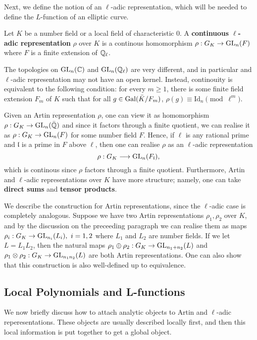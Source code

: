 Next, we define the notion of an $\ell$-adic representation, which will be needed to define the $L$-function of an elliptic curve.

\begin{defn}
    Let $K$ be a number field or a local field of characteristic $0$. A \textbf{continuous $\ell$-adic representation} $\rho$ over $K$ is a continous homomorphism $\rho:G_K\to\mathrm{GL}_n(F)$ where $F$ is a finite extension of $\mathbb{Q}_\ell$.
\end{defn}

\begin{rem} \label{rem_cont_ladic}
    The topologies on $\mathrm{GL}_n(\mathbb{C})$ and $\mathrm{GL}_n(\mathbb{Q}_\ell)$ are very different, and in particular and $\ell$-adic representation may not have an open kernel. Instead, continouity is equivalent to the following condition: for every $m\geq1$, there is some finite field extension $F_m$ of $K$ such that for all $g\in\mathrm{Gal}(\bar{K}/F_m)$, $\rho(g)\equiv \mathrm{Id}_n\pmod{\ell^m}$.
\end{rem}

Given an Artin representation $\rho$, one can view it as homomorphism $\rho:G_K\to\mathrm{GL}_n(\bar{\mathbb{Q}})$ and since it factors through a finite quotient, we can realise it as $\rho:G_K\to\mathrm{GL}_n(F)$ for some number field $F$. Hence, if $\ell$ is any rational prime and $\mathfrak{l}$ is a prime in $F$ above $\ell$, then one can realise $\rho$ as an $\ell$-adic representation $$\rho:G_K\longrightarrow\mathrm{GL}_n(F_\mathfrak{l}),$$
which is continous since $\rho$ factors through a finite quotient. Furthermore, Artin and $\ell$-adic representations over $K$ have more structure; namely, one can take \textbf{direct sums} and \textbf{tensor products}.

We describe the construction for Artin representations, since the $\ell$-adic case is completely analogous. Suppose we have two Artin representations $\rho_1,\rho_2$ over $K$, and by the discussion on the preceeding paragraph we can realise them as maps $\rho_i:G_K\to\GL_{n_i}(L_i),\ i=1,2$ where $L_1$ and $L_2$ are number fields. If we let $L=L_1L_2$, then the natural maps $\rho_1\oplus\rho_2:G_K\to\mathrm{GL}_{n_1+n_2}(L)$ and $\rho_1\otimes\rho_2:G_K\to\mathrm{GL}_{n_1n_2}(L)$ are both Artin representations. One can also show that this construction is also well-defined up to equivalence.

\subsection{Local Polynomials and L-functions}
We now briefly discuss how to attach analytic objects to Artin and $\ell$-adic reperesentations. These objects are usually described locally first, and then this local information is put together to get a global object. 

